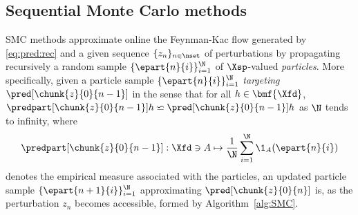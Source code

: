 \subsection{Sequential Monte Carlo methods}
SMC methods approximate online the Feynman-Kac flow generated by \eqref{eq:pred:rec} and a given sequence $\{ z_n \}_{n \in \nset}$ of perturbations by propagating recursively a random sample  $\{ \epart{n}{i} \}_{i = 1}^\N$ of $\Xsp$-valued \emph{particles}. More specifically, given a particle sample $\{ \epart{n}{i} \}_{i = 1}^\N$ \emph{targeting} $\pred[\chunk{z}{0}{n - 1}]$ in the sense that for all $h \in \bmf{\Xfd}$, $\predpart[\chunk{z}{0}{n - 1}] h \backsimeq \pred[\chunk{z}{0}{n - 1}] h$ as $\N$ tends to infinity, where  
$$
    \predpart[\chunk{z}{0}{n - 1}]: \Xfd \ni A \mapsto \frac{1}{\N} \sum_{i = 1}^\N \1_A(\epart{n}{i})
$$
denotes the empirical measure associated with the particles, an updated particle sample $\{ \epart{n + 1}{i} \}_{i = 1}^\N$ approximating $\pred[\chunk{z}{0}{n}]$ is, as the perturbation $z_n$ becomes accessible, formed by Algorithm~\ref{alg:SMC}. 

